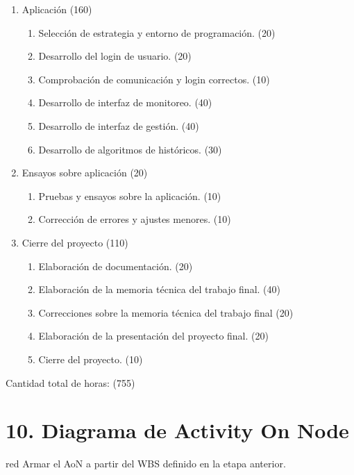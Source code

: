 \documentclass[
11pt, %
codirector, %
]{charter}
\begin{document}
\begin{enumerate}
\begin{enumerate}
	\end{enumerate}
\item Aplicación (160)
	\begin{enumerate}
	\item Selección de estrategia y entorno de programación. (20)
	\item Desarrollo del login de usuario. (20)
	\item Comprobación de comunicación y login correctos. (10)
    \item Desarrollo de interfaz de monitoreo. (40)
    \item Desarrollo de interfaz de gestión. (40)
	\item Desarrollo de algoritmos de históricos. (30)
	\end{enumerate}
\item Ensayos sobre aplicación (20)
	\begin{enumerate}
	\item Pruebas y ensayos sobre la aplicación. (10)
	\item Corrección de errores y ajustes menores. (10)
	\end{enumerate}
\item Cierre del proyecto (110)
	\begin{enumerate}
	\item Elaboración de documentación. (20)
	\item Elaboración de la memoria técnica del trabajo final. (40)
	\item Correcciones sobre la memoria técnica del trabajo final (20) 
	\item Elaboración de la presentación del proyecto final. (20)
	\item Cierre del proyecto. (10)
	\end{enumerate}
\end{enumerate}

Cantidad total de horas: (755)
 
\vspace{600px}

\section{10. Diagrama de Activity On Node}
\label{sec:AoN}

\begin{consigna}{red}
Armar el AoN a partir del WBS definido en la etapa anterior. 



\end{consigna}
\end{document}

